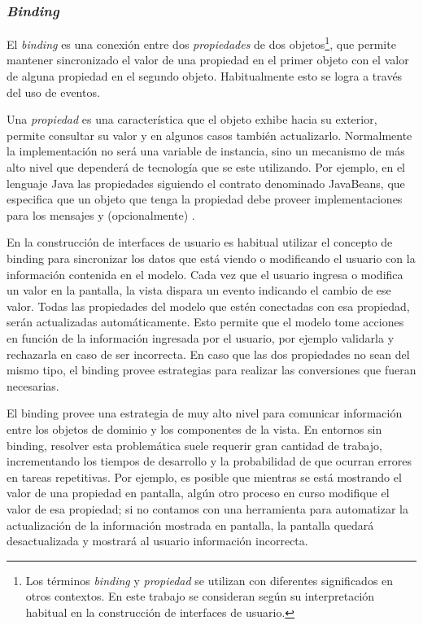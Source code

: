 \subsubsection{\emph{Binding}}
\label{binding}

	El \emph{binding} es una conexión entre dos \emph{propiedades} de dos
	objetos\footnote{Los términos \emph{binding} y \emph{propiedad} se utilizan
	con diferentes significados en otros contextos. En este trabajo se consideran
	según su interpretación habitual en la construcción de interfaces de usuario.}, que
	permite mantener sincronizado el valor de una propiedad en el primer objeto
	con el valor de alguna propiedad en el segundo objeto.
	Habitualmente esto se logra a través del uso de eventos.
	
	Una \emph{propiedad} es una característica que el objeto exhibe hacia su exterior, 
	permite consultar su valor y en algunos casos también actualizarlo.
	Normalmente la implementación no será una variable de instancia, sino un
	mecanismo de más alto nivel que dependerá de tecnología que se este utilizando.
	Por ejemplo, en el lenguaje Java las propiedades siguiendo el contrato
	denominado JavaBeans, que especifica que un objeto que tenga la propiedad
	 debe proveer implementaciones para los mensajes 
	y (opcionalmente) .
	
	En la construcción de interfaces de usuario es habitual utilizar el concepto de
	binding para sincronizar los datos que está viendo o modificando el usuario
	con la información contenida en el modelo.
	Cada vez que el usuario ingresa o modifica un valor en la pantalla, la
	vista dispara un evento indicando el cambio de ese valor. Todas las
	propiedades del modelo que estén conectadas con esa propiedad, serán
	actualizadas automáticamente.
	Esto permite que el modelo tome acciones en función de la información ingresada por el usuario, 
	por ejemplo validarla y rechazarla en caso de ser incorrecta.
	En caso que las dos propiedades no sean del mismo tipo, el binding provee
	estrategias para realizar las conversiones que fueran necesarias.
		
	\bigskip

	El binding provee una estrategia de muy alto nivel para comunicar información entre
	los objetos de dominio y los componentes de la vista.
	En entornos sin binding, resolver esta problemática suele requerir gran
	cantidad de trabajo, incrementando los tiempos de desarrollo y la probabilidad
	de que ocurran errores en tareas repetitivas.
	Por ejemplo, es posible que mientras se está mostrando el valor de una
	propiedad en pantalla, algún otro proceso en curso modifique el valor de esa propiedad; 
	si no contamos con una herramienta
	para automatizar la actualización de la información mostrada en
	pantalla, la pantalla quedará desactualizada y mostrará al usuario información incorrecta.

